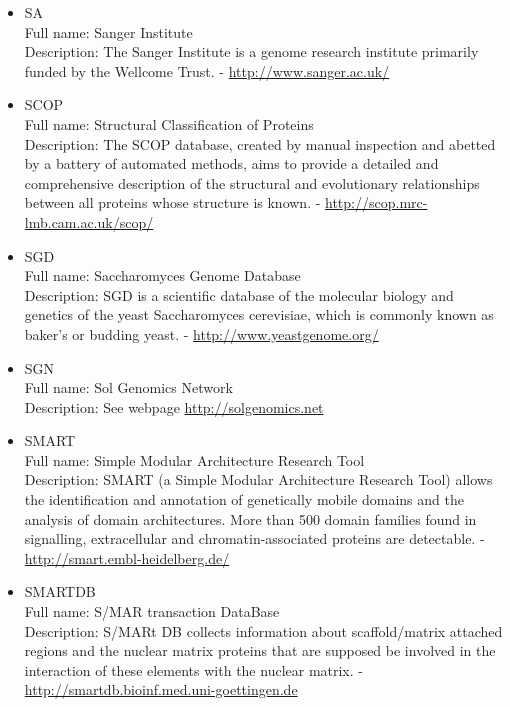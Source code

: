 \begin{itemize}
\item{SA}\\ Full name: Sanger Institute\\ Description: The Sanger Institute is a genome research institute primarily funded by the Wellcome Trust. - 
\url{http://www.sanger.ac.uk/}

\item{SCOP}\\ Full name: Structural Classification of Proteins\\ Description: The SCOP database, created by manual inspection and abetted by a battery of automated methods, aims to provide a detailed and comprehensive description of the structural and evolutionary relationships between all proteins whose structure is known. - 
\url{http://scop.mrc-lmb.cam.ac.uk/scop/}

\item{SGD}\\ Full name: Saccharomyces Genome Database\\ Description: SGD is a scientific database of the molecular biology and genetics of the yeast Saccharomyces cerevisiae, which is commonly known as baker's or budding yeast. - 
\url{http://www.yeastgenome.org/}

\item{SGN}\\ Full name: Sol Genomics Network\\ Description: See webpage 
\url{http://solgenomics.net}

\item{SMART}\\ Full name: Simple Modular Architecture Research Tool\\ Description: SMART (a Simple Modular Architecture Research Tool) allows the identification and annotation of genetically mobile domains and the analysis of domain architectures. More than 500 domain families found in signalling, extracellular and chromatin-associated proteins are detectable. - 
\url{http://smart.embl-heidelberg.de/}

\item{SMARTDB}\\ Full name: S/MAR transaction DataBase\\ Description: S/MARt DB collects information about scaffold/matrix attached regions and the nuclear matrix proteins that are supposed be involved in the interaction of these elements with the nuclear matrix. - 
\url{http://smartdb.bioinf.med.uni-goettingen.de}


\end{itemize}
